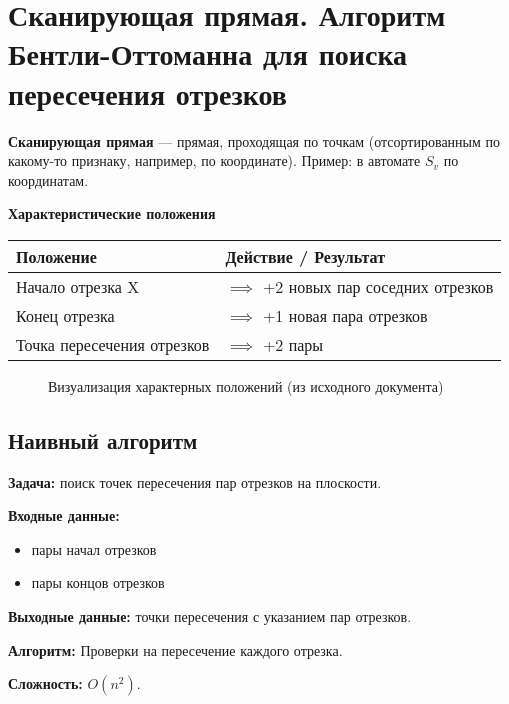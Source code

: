 \section{Сканирующая прямая. Алгоритм Бентли-Оттоманна для поиска пересечения отрезков}

\textbf{Сканирующая прямая} --- прямая, проходящая по точкам (отсортированным по какому-то признаку, например, по координате). Пример: в автомате $S_v$ по координатам. 

\begin{center}
	\textbf{Характеристические положения}
\end{center}
\begin{tabular}{|l|l|}
	\hline
	\textbf{Положение} & \textbf{Действие / Результат} \\
	\hline
	Начало отрезка X & $\implies$ +2 новых пар соседних отрезков  \\
	\hline
	Конец отрезка & $\implies$ +1 новая пара отрезков  \\
	\hline
	Точка пересечения отрезков & $\implies$ +2 пары  \\
	\hline
\end{tabular}

\begin{figure}[h!]
	\centering
	\caption*{Визуализация характерных положений (из исходного документа)} %
\end{figure}

\subsection{Наивный алгоритм}

\textbf{Задача:} поиск точек пересечения пар отрезков на плоскости. 

\textbf{Входные данные:}
\begin{itemize}
	\item пары начал отрезков
	\item пары концов отрезков
\end{itemize}

\textbf{Выходные данные:} точки пересечения с указанием пар отрезков. 

\textbf{Алгоритм:} Проверки на пересечение каждого отрезка. 

\textbf{Сложность:} $O(n^2)$. 

